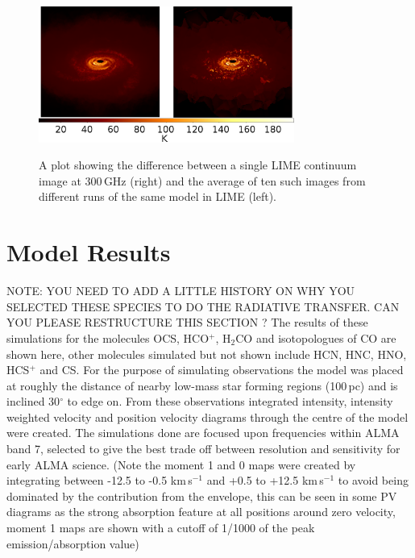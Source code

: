 \documentclass[useAMS,usenatbib]{mn2e}
\begin{document}
\begin{figure}
 \includegraphics[width=84mm]{Figures/sim/average_comparison.png}
 \label{averages}
 \caption{A plot showing the difference between a single LIME continuum image at 300$\,$GHz (right) and the average of ten such images from different runs of the same model in LIME (left).}
\end{figure}


\section{Model Results} \label{sec:model_results}

NOTE: YOU NEED TO ADD A LITTLE HISTORY ON WHY YOU SELECTED THESE SPECIES TO DO THE RADIATIVE TRANSFER. CAN YOU PLEASE RESTRUCTURE THIS SECTION ?
The results of these simulations for the molecules OCS, HCO$^+$, H$_2$CO and isotopologues of CO are shown here, other molecules simulated but not shown include HCN, HNC, HNO, HCS$^+$ and  CS.
For the purpose of simulating observations the model was placed at roughly the distance of nearby low-mass star forming regions (100$\,$pc) and is inclined 30$^\circ$ to edge on. From these observations integrated intensity, intensity weighted velocity and position velocity diagrams through the centre of the model were created.
The simulations done are focused upon frequencies within ALMA band 7, selected to give the best trade off between resolution and sensitivity for early ALMA science.
(Note the moment 1 and 0 maps were created by integrating between -12.5 to -0.5 km$\,$s$^{-1}$ and +0.5 to +12.5 km$\,$s$^{-1}$ to avoid being dominated by the contribution from the envelope, this can be seen in some PV diagrams as the strong absorption feature at all positions around zero velocity, moment 1 maps are shown with a cutoff of 1/1000 of the peak emission/absorption value)\newline
\end{document}
